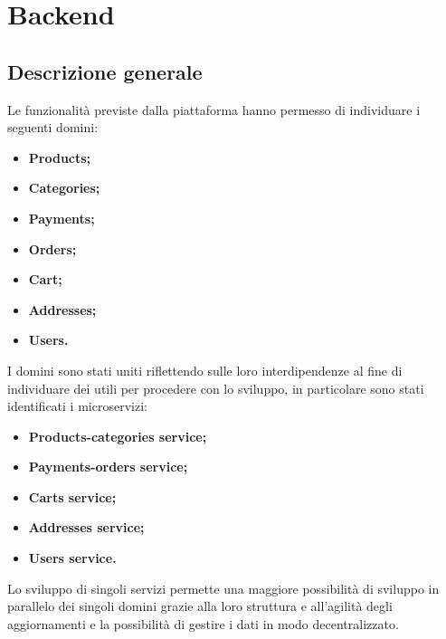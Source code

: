 \section{Backend}

\subsection{Descrizione generale}
Le funzionalità previste dalla piattaforma hanno permesso di individuare i seguenti domini:
\begin{itemize}
	\item \textbf{Products;}
	\item \textbf{Categories;}
	\item \textbf{Payments;}
	\item \textbf{Orders;}
	\item \textbf{Cart;}
	\item \textbf{Addresses;}
	\item \textbf{Users.}
\end{itemize}
I domini sono stati uniti riflettendo sulle loro interdipendenze al fine di individuare dei  utili per procedere con lo sviluppo, in particolare sono stati identificati i microservizi:
\begin{itemize}
	\item \textbf{Products-categories service;}
	\item \textbf{Payments-orders service;}
	\item \textbf{Carts service;}
	\item \textbf{Addresses service;}
	\item \textbf{Users service.}
\end{itemize}
Lo sviluppo di singoli servizi permette una maggiore possibilità di sviluppo in parallelo dei singoli domini grazie alla loro struttura e all'agilità degli aggiornamenti e la possibilità di gestire i dati in modo decentralizzato.

